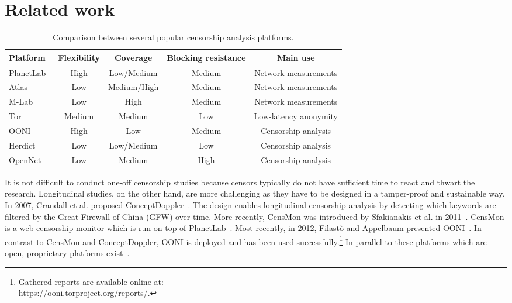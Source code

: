 \section{Related work}
\label{related_work}
\begin{table*}[ht!]
\centering
\begin{tabular}{l|cccc}
\textbf{Platform} & \textbf{Flexibility} & \textbf{Coverage} &
\textbf{Blocking resistance} & \textbf{Main use} \\
\hline 
PlanetLab~\cite{planetlab} & High & Low/Medium & Medium & Network measurements \\
Atlas~\cite{atlas} & Low & Medium/High & Medium & Network measurements \\
M-Lab~\cite{dovrolis2010measurement} & Low & High & Medium & Network measurements \\
Tor~\cite{Dingledine2004} & Medium & Medium & Low & Low-latency anonymity \\
OONI~\cite{Filasto2012} & High & Low & Medium & Censorship analysis \\
Herdict~\cite{Herdict} & Low & Low/Medium & Low & Censorship analysis \\
OpenNet~\cite{opennet} & Low & Medium & High & Censorship analysis \\
\hline 
\end{tabular} 
\caption{Comparison between several popular censorship analysis platforms.}
\label{tab:comparison}
\end{table*}

It is not difficult to conduct one-off censorship studies because censors
typically do not have sufficient time to react and thwart the research.
Longitudinal studies, on the other hand, are more challenging as they have to
be designed in a tamper-proof and sustainable way.  In 2007, Crandall et al.
proposed ConceptDoppler~\cite{Crandall2007}.  The design enables longitudinal
censorship analysis by detecting which keywords are filtered by the Great
Firewall of China (GFW) over time.  More recently, CensMon was introduced by
Sfakianakis et al. in 2011~\cite{Sfakianakis2011}.  CensMon is a web censorship
monitor which is run on top of PlanetLab~\cite{planetlab}.  Most recently, in
2012, Filast\`{o} and Appelbaum presented OONI~\cite{Filasto2012}.  In
contrast to CensMon and ConceptDoppler, OONI is deployed and has been used
successfully.\footnote{Gathered reports are available online at:\\
\url{https://ooni.torproject.org/reports/}.}  In parallel to these platforms
which are open, proprietary platforms exist~\cite{hwang2007herdict,opennet}.

